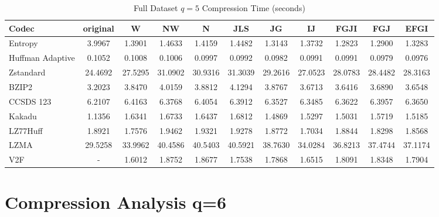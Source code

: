 \documentclass{article}
\begin{document}
\begin{table}[h!]
\centering
\caption{Full Dataset $q=5$ Compression Time (seconds)}
\begin{tabular}{|l|cccccccccc|}
\hline
Codec &  original &       W &      NW &       N &     JLS &      JG &      IJ &    FGJI &     FGJ &    EFGI \\
\hline
Entropy & 3.9967 & 1.3901 & 1.4633 & 1.4159 & 1.4482 & 1.3143 & 1.3732 & 1.2823 & 1.2900 & 1.3283         \\
\hline
Huffman Adaptive &    0.1052 &  0.1008 &  0.1006 &  0.0997 &  0.0992 &  0.0982 &  0.0991 &  0.0991 &  0.0979 &  0.0976 \\
Zstandard        &   24.4692 & 27.5295 & 31.0902 & 30.9316 & 31.3039 & 29.2616 & 27.0523 & 28.0783 & 28.4482 & 28.3163 \\
BZIP2            &    3.2023 &  3.8470 &  4.0159 &  3.8812 &  4.1294 &  3.8767 &  3.6713 &  3.6416 &  3.6890 &  3.6548 \\
CCSDS 123        &    6.2107 &  6.4163 &  6.3768 &  6.4054 &  6.3912 &  6.3527 &  6.3485 &  6.3622 &  6.3957 &  6.3650 \\
Kakadu           &    1.1356 &  1.6341 &  1.6733 &  1.6437 &  1.6812 &  1.4869 &  1.5297 &  1.5031 &  1.5719 &  1.5185 \\
LZ77Huff         &    1.8921 &  1.7576 &  1.9462 &  1.9321 &  1.9278 &  1.8772 &  1.7034 &  1.8844 &  1.8298 &  1.8568 \\
LZMA             &   29.5258 & 33.9962 & 40.4586 & 40.5403 & 40.5921 & 38.7630 & 34.0284 & 36.8213 & 37.4744 & 37.1174 \\
V2F              &    - &  1.6012 &  1.8752 &  1.8677 &  1.7538 &  1.7868 &  1.6515 &  1.8091 &  1.8348 &  1.7904 \\
\hline
\end{tabular}
\end{table}

\newpage
\section{Compression Analysis q=6}
\end{document}
